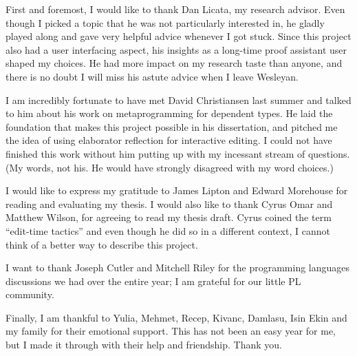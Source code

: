 \documentclass[11pt, ma]{westhesis}
\theoremstyle{plain}
\theoremstyle{definition}
\begin{document}
\begin{acknowledgements}
First and foremost, I would like to thank Dan Licata, my research advisor.
Even though I picked a topic that he was not particularly interested in, he
gladly played along and gave very helpful advice whenever I got
stuck. Since this project also had a user interfacing aspect, his insights as a
long-time proof assistant user shaped my choices.
He had more impact on my research taste than anyone, and there is no doubt I
will miss his astute advice when I leave Wesleyan.

I am incredibly fortunate to have met David Christiansen last summer and talked
to him about his work on metaprogramming for dependent types.
He laid the foundation that makes this project possible in his
dissertation\cite{davidphd}, and pitched me the idea of using elaborator
reflection for interactive editing.
I could not have finished this work without him putting up with my incessant
stream of questions.  (My words, not his. He would have strongly disagreed
with my word choices.)

I would like to express my gratitude to James Lipton and Edward Morehouse for
reading and evaluating my thesis. I would also like to thank Cyrus Omar and
Matthew Wilson, for agreeing to read my thesis draft. Cyrus coined the term
``edit-time tactics'' and even though he did so in a different
context\cite{hazelnut}, I cannot think of a better way to describe this
project.

I want to thank Joseph Cutler and Mitchell Riley for the programming languages
discussions we had over the entire year; I am grateful for our little PL
community.

Finally, I am thankful to Yulia, Mehmet, Recep, Kivanc, Damlasu, Isin Ekin and
my family for their emotional support. This has not been an easy year for me,
but I made it through with their help and friendship. Thank you.
\end{acknowledgements}

\frontmatter
\maketitle
\makeabstract

\tableofcontents

\mainmatter











\end{document}
